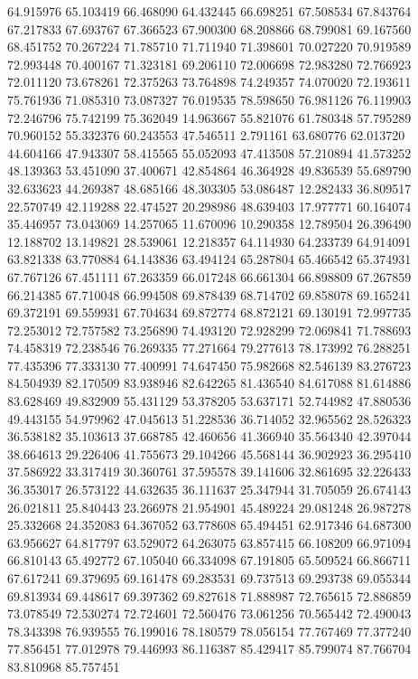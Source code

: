64.915976
65.103419
66.468090
64.432445
66.698251
67.508534
67.843764
67.217833
67.693767
67.366523
67.900300
68.208866
68.799081
69.167560
68.451752
70.267224
71.785710
71.711940
71.398601
70.027220
70.919589
72.993448
70.400167
71.323181
69.206110
72.006698
72.983280
72.766923
72.011120
73.678261
72.375263
73.764898
74.249357
74.070020
72.193611
75.761936
71.085310
73.087327
76.019535
78.598650
76.981126
76.119903
72.246796
75.742199
75.362049
14.963667
55.821076
61.780348
57.795289
70.960152
55.332376
60.243553
47.546511
2.791161
63.680776
62.013720
44.604166
47.943307
58.415565
55.052093
47.413508
57.210894
41.573252
48.139363
53.451090
37.400671
42.854864
46.364928
49.836539
55.689790
32.633623
44.269387
48.685166
48.303305
53.086487
12.282433
36.809517
22.570749
42.119288
22.474527
20.298986
48.639403
17.977771
60.164074
35.446957
73.043069
14.257065
11.670096
10.290358
12.789504
26.396490
12.188702
13.149821
28.539061
12.218357
64.114930
64.233739
64.914091
63.821338
63.770884
64.143836
63.494124
65.287804
65.466542
65.374931
67.767126
67.451111
67.263359
66.017248
66.661304
66.898809
67.267859
66.214385
67.710048
66.994508
69.878439
68.714702
69.858078
69.165241
69.372191
69.559931
67.704634
69.872774
68.872121
69.130191
72.997735
72.253012
72.757582
73.256890
74.493120
72.928299
72.069841
71.788693
74.458319
72.238546
76.269335
77.271664
79.277613
78.173992
76.288251
77.435396
77.333130
77.400991
74.647450
75.982668
82.546139
83.276723
84.504939
82.170509
83.938946
82.642265
81.436540
84.617088
81.614886
83.628469
49.832909
55.431129
53.378205
53.637171
52.744982
47.880536
49.443155
54.979962
47.045613
51.228536
36.714052
32.965562
28.526323
36.538182
35.103613
37.668785
42.460656
41.366940
35.564340
42.397044
38.664613
29.226406
41.755673
29.104266
45.568144
36.902923
36.295410
37.586922
33.317419
30.360761
37.595578
39.141606
32.861695
32.226433
36.353017
26.573122
44.632635
36.111637
25.347944
31.705059
26.674143
26.021811
25.840443
23.266978
21.954901
45.489224
29.081248
26.987278
25.332668
24.352083
64.367052
63.778608
65.494451
62.917346
64.687300
63.956627
64.817797
63.529072
64.263075
63.857415
66.108209
66.971094
66.810143
65.492772
67.105040
66.334098
67.191805
65.509524
66.866711
67.617241
69.379695
69.161478
69.283531
69.737513
69.293738
69.055344
69.813934
69.448617
69.397362
69.827618
71.888987
72.765615
72.886859
73.078549
72.530274
72.724601
72.560476
73.061256
70.565442
72.490043
78.343398
76.939555
76.199016
78.180579
78.056154
77.767469
77.377240
77.856451
77.012978
79.446993
86.116387
85.429417
85.799074
87.766704
83.810968
85.757451
